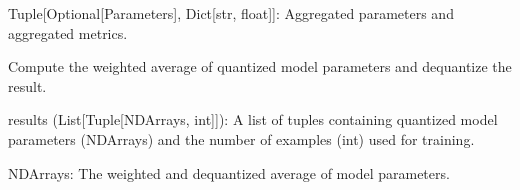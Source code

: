 \documentclass[letterpaper,10pt,english]{sphinxmanual}
\begin{document}
\begin{fulllineitems}
\begin{fulllineitems}
\begin{description}
\sphinxAtStartPar
Tuple{[}Optional{[}Parameters{]}, Dict{[}str, float{]}{]}: Aggregated parameters and aggregated metrics.

\end{description}

\end{fulllineitems}


\end{fulllineitems}


\begin{fulllineitems}
\label{\detokenize{insur_maskedAgg:insur_maskedAgg.aggregate_qt}}
\pysigstartsignatures
{}
\pysigstopsignatures
\sphinxAtStartPar
Compute the weighted average of quantized model parameters and dequantize the result.
\begin{description}
\sphinxAtStartPar
results (List{[}Tuple{[}NDArrays, int{]}{]}): A list of tuples containing quantized model parameters (NDArrays)  and the number of examples (int) used for training.

\sphinxAtStartPar
NDArrays: The weighted and dequantized average of model parameters.

\end{description}

\end{fulllineitems}


\begin{fulllineitems}
\label{\detokenize{insur_maskedAgg:insur_maskedAgg.aggregate_qt2}}
\pysigstartsignatures
{}
\pysigstopsignatures
\end{fulllineitems}
\end{document}
